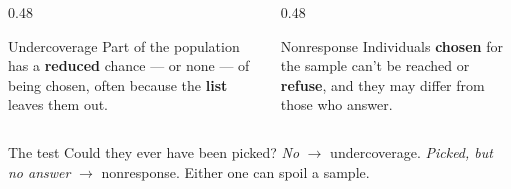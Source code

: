 \documentclass[aspectratio=169, 11pt]{beamer}
\begin{document}
\begin{frame}[t, plain]
  \vspace{2pt}
  \begin{columns}[t]
    \begin{column}{0.48\textwidth}
      \begin{block}{Undercoverage}
        Part of the population has a \textbf{reduced} chance --- or none --- of being chosen,
        often because the \textbf{list} leaves them out.
      \end{block}
    \end{column}
    \begin{column}{0.48\textwidth}
      \begin{block}{Nonresponse}
        Individuals \textbf{chosen} for the sample can't be reached or \textbf{refuse}, and
        they may differ from those who answer.
      \end{block}
    \end{column}
  \end{columns}
  \vspace{8pt}
  \begin{block}{The test}
    Could they ever have been picked? \emph{No} $\to$ undercoverage. \quad \emph{Picked, but no
    answer} $\to$ nonresponse. \quad Either one can spoil a  sample.
  \end{block}
\end{frame}
\end{document}
